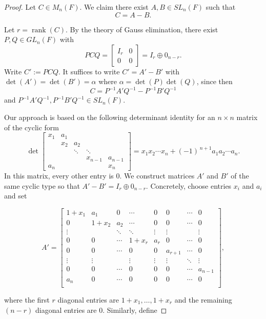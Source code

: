 \documentclass[11pt, a4paper]{amsart}
\theoremstyle{definition}
\numberwithin{equation}{section}
\begin{document}
\begin{proof}
Let \(C\in M_n(F)\). We claim there exist \(A,B\in SL_n(F)\) such that
\[
C=A-B.
\]

Let \(r=\operatorname{rank}(C)\). By the theory of Gauss elimination, there exist \(P,Q\in GL_n(F)\) with
\[
PCQ=\begin{bmatrix}I_r & 0\\[4pt]0 & 0\end{bmatrix}=I_r\oplus 0_{n-r}.
\]
Write \(C':=PCQ\). It suffices to write \(C'=A'-B'\) with \(\det(A')=\det(B')= \alpha\) where $\alpha = \det(P) \det(Q)$, since then
\[
C=P^{-1}A'Q^{-1}-P^{-1}B'Q^{-1}
\]
and \(P^{-1}A'Q^{-1},P^{-1}B'Q^{-1}\in SL_n(F)\).

Our approach is based on the following determinant identity for an \(n\times n\) matrix of the cyclic form
\[
\det\begin{bmatrix}
x_1 & a_1 &  &  &  \\
 & x_2 & a_2 &  &  \\
 &  & \ddots & \ddots & \\
 &  &  & x_{n-1} & a_{n-1} \\
a_n &  &  &  & x_n
\end{bmatrix}
= x_1x_2\cdots x_n + (-1)^{\,n+1}a_1a_2\cdots a_n.
\]
In this matrix, every other entry is $0.$ We construct matrices \(A'\) and \(B'\) of the same cyclic type so that \(A'-B'=I_r\oplus 0_{n-r}\). Concretely, choose entries \(x_i\) and \(a_i\) and set



\[
A'=
\begin{bmatrix}
1+x_1 & a_1 & 0 & \cdots & 0 & 0 & \cdots & 0\\
0 & 1+x_2 & a_2 & \cdots & 0 & 0 & \cdots & 0\\
\vdots & & \ddots & \ddots & \vdots & \vdots & & \vdots\\
0 & 0 & \cdots & 1+x_r & a_r & 0 & \cdots & 0\\
0 & 0 & \cdots & 0 & 0 & a_{r+1} & \cdots & 0\\
\vdots & \vdots & & \vdots & \vdots & \vdots & \ddots & \vdots\\
0 & 0 & \cdots & 0 & 0 & 0 & \cdots  & a_{n-1} \\
a_n & 0 & \cdots & 0 & 0 & 0 & \cdots  & 0 \\
\end{bmatrix},
\]

where the first $r$ diagonal entries are \(1+x_1,\dots,1+x_r\) and the remaining $(n-r)$ diagonal entries are 0. Similarly, define  


\end{proof}
\end{document}
